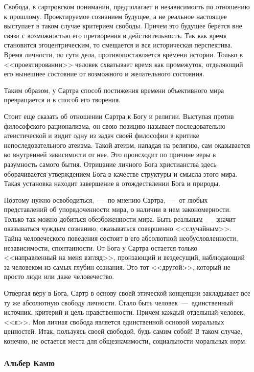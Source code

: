 \documentclass{bmstu}
\begin{document}
Свобода, в сартровском понимании, предполагает и независимость по отношению к прошлому. Проектируемое сознанием будущее, а не реальное настоящее выступает в таком случае критерием свободы. Причем это будущее берется вне связи с возможностью его претворения в действительность. Так как время становится эгоцентрическим, то смещается и вся историческая перспектива. Время личности, по сути дела, противопоставляется времени истории. Только в <<проектировании>> человек схватывает время как промежуток, отделяющий его нынешнее состояние от возможного и желательного состояния.

Таким образом, у Сартра способ постижения времени объективного мира превращается и в способ его творения.

Стоит еще сказать об отношении Сартра к Богу и религии. Выступая против философского рационализма, он свою позицию называет последовательно атеистической и видит одну из задач своей философии в критике непоследовательного атеизма. Такой атеизм, нападая на религию, сам оказывается во внутренней зависимости от нее. Это происходит по причине веры в разумность самого бытия. Отрицание личного Бога христианства здесь оборачивается утверждением Бога в качестве структуры и смысла этого мира. Такая установка находит завершение в отождествлении Бога и природы.

Поэтому нужно освободиться,~---~по мнению Сартра,~---~от любых представлений об упорядоченности мира, о наличии в нем закономерности. Только так можно добиться обезбоженности мира. Быть реальным~---~значит оказываться чуждым сознанию, оказываться совершенно <<случайным>>. Тайна человеческого поведения состоит в его абсолютной необусловленности, независимости, спонтанности. От Бога у Сартра остается только <<направленный на меня взгляд>>, пронзающий и вездесущий, наблюдающий за человеком из самых глубин сознания. Это тот <<другой>>, который не просто люди или даже человечество.

Отвергая веру в Бога, Сартр в основу своей этической концепции закладывает все ту же абсолютную свободу личности. Стало быть человек~---~единственный источник, критерий и цель нравственности. Причем каждый отдельный человек, <<я>>. Моя личная свобода является единственной основой моральных ценностей. Итак, пользуясь своей свободой, будь самим собой! В таком случае, конечно, не остается места для общезначимости, социальности моральных норм.

\subsubsection*{Альбер Камю}
\end{document}
